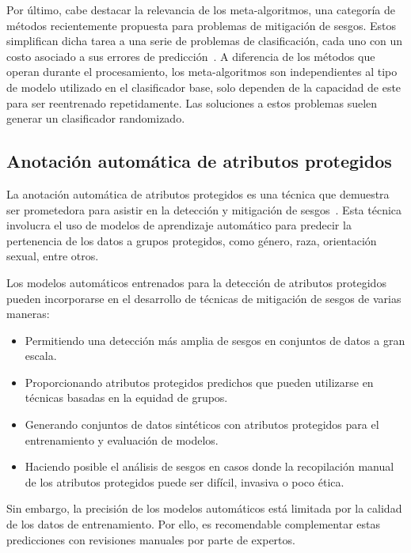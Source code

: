 Por \'ultimo, cabe destacar la relevancia de los meta-algoritmos, una categor\'ia de m\'etodos recientemente propuesta para problemas de 
mitigaci\'on de sesgos. Estos simplifican dicha tarea a una serie de problemas de clasificaci\'on, cada uno con 
un costo asociado a sus errores de predicci\'on~\parencite{agarwal2018reductions, agarwal2019fair}.
A diferencia de los m\'etodos que operan durante el procesamiento, los meta-algoritmos son independientes al tipo de modelo utilizado en el 
clasificador base, solo dependen de la capacidad de este para ser reentrenado repetidamente. Las soluciones a estos problemas suelen generar
un clasificador randomizado.

\subsection{Anotaci\'on autom\'atica de atributos protegidos}
La anotaci\'on autom\'atica de atributos protegidos es una t\'ecnica que demuestra ser prometedora para asistir en la detecci\'on y 
mitigaci\'on de sesgos~\parencite{soumah2023radar,dinan2020multidimensional,10.1007/978-3-031-35320-8_39,6906255,Rajendra_2021}. 
Esta t\'ecnica involucra el uso de modelos de aprendizaje autom\'atico para predecir la pertenencia de los datos a grupos protegidos, 
como g\'enero, raza, orientaci\'on sexual, entre otros. 

Los modelos autom\'aticos entrenados para la detecci\'on de atributos protegidos pueden incorporarse en el desarrollo de t\'ecnicas
de mitigaci\'on de sesgos de varias maneras:
\begin{itemize}
    \item Permitiendo una detecci\'on m\'as amplia de sesgos en conjuntos de datos a gran escala.
    \item Proporcionando atributos protegidos predichos que pueden utilizarse en t\'ecnicas basadas en 
    la equidad de grupos.
    \item Generando conjuntos de datos sint\'eticos con atributos protegidos para el entrenamiento y evaluaci\'on de 
    modelos.
    \item Haciendo posible el an\'alisis de sesgos en casos donde la recopilaci\'on manual de los atributos protegidos
    puede ser dif\'icil, invasiva o poco \'etica.
\end{itemize}

Sin embargo, la precisi\'on de los modelos autom\'aticos est\'a limitada por la calidad de los datos de entrenamiento. Por ello, es 
recomendable complementar estas predicciones con revisiones manuales por parte de expertos.
 
